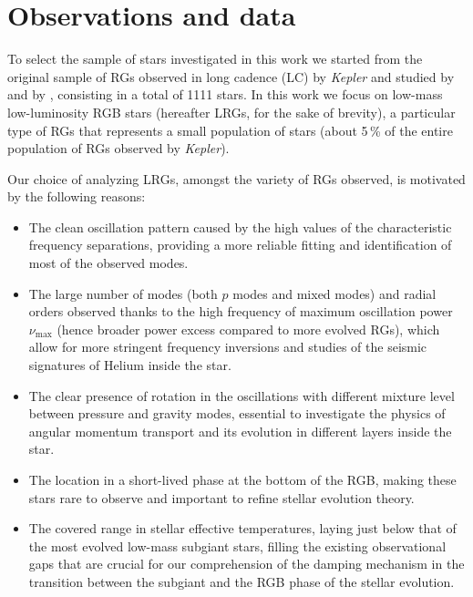 \documentclass[structabstract]{aa}
\newcommand{\Kepler}{\textit{Kepler}}
\newcommand{\kepler}{\textit{Kepler} }
\newcommand{\numax}{\nu_\mathrm{max}}
\begin{document}
\section{Observations and data} 
\label{sec:data}
To select the sample of stars investigated in this work we started from the original sample of RGs observed in long cadence (LC) by \kepler \citep{Jenkins10} and studied by \cite{Huber11} and by \cite{Corsaro13}, consisting in a total of 1111 stars. In this work we focus on low-mass low-luminosity RGB stars (hereafter LRGs, for the sake of brevity), a particular type of RGs that represents a small population of stars (about 5\,\% of the entire population of RGs observed by \Kepler). 

Our choice of analyzing LRGs, amongst the variety of RGs observed, is motivated by the following reasons:
\begin{itemize}
\item The clean oscillation pattern caused by the high values of the characteristic frequency separations, providing a more reliable fitting and identification of most of the observed modes.
\item The large number of modes (both $p$ modes and mixed modes) and radial orders observed thanks to the high frequency of maximum oscillation power $\numax$ (hence broader power excess compared to more evolved RGs), which allow for more stringent frequency inversions and studies of the seismic signatures of Helium inside the star.
\item The clear presence of rotation in the oscillations with different mixture level between pressure and gravity modes, essential to investigate the physics of angular momentum transport and its evolution in different layers inside the star.
\item The location in a short-lived phase at the bottom of the RGB, making these stars rare to observe and important to refine stellar evolution theory.
\item The covered range in stellar effective temperatures, laying just below that of the most evolved low-mass subgiant stars, filling the existing observational gaps that are crucial for our comprehension of the damping mechanism in the transition between the subgiant and the RGB phase of the stellar evolution.
\end{itemize} 
\end{document}
